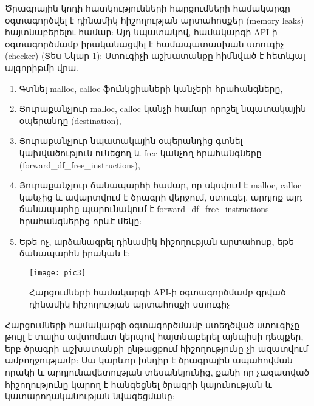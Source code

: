 Ծրագրային կոդի հատկությունների հարցումների համակարգը օգտագործվել է դինամիկ հիշողության
արտահոսքեր (memory leaks)\cite{MEMORYLEAK} հայտնաբերելու համար: Այդ նպատակով, համակարգի API-ի օգտագործմամբ
իրականացվել է համապատասխան ստուգիչ (checker) (Տես Նկար \ref{fig:figure3}): Ստուգիչի աշխատանքը հիմնված է հետևյալ ալգորիթմի վրա.
\begin{enumerate}
    \item Գտնել malloc, calloc ֆունկցիաների կանչերի հրահանգները,
    \item Յուրաքանչյուր malloc, calloc կանչի համար որոշել նպատակային օպերանդը (destination),
    \item Յուրաքանչյուր նպատակային օպերանդից գտնել կախվածություն ունեցող և free կանչող հրահանգները (forward\_df\_free\_instructions),
    \item Յուրաքանչյուր ճանապարհի համար, որ սկսվում է malloc, calloc կանչից և ավարտվում է ծրագրի վերջում, ստուգել,
    արդյոք այդ ճանապարհը պարունակում է forward\_df\_free\_instructions հրահանգներից որևէ մեկը:
    \item Եթե ոչ, արձանագրել դինամիկ հիշողության արտահոսք, եթե ճանապարհն իրական է:
\end{enumerate}

\begin{figure}[h]
    \centering
    \texttt{[image: pic3]}
    \caption{Հարցումների համակարգի API-ի օգտագործմամբ գրված դինամիկ հիշողության արտահոսքի ստուգիչ}
    \label{fig:figure3}
\end{figure}

Հարցումների համակարգի օգտագործմամբ ստեղծված ստուգիչը թույլ է տալիս ավտոմատ կերպով հայտնաբերել
այնպիսի դեպքեր, երբ ծրագրի աշխատանքի ընթացքում հիշողությունը չի ազատվում ամբողջությամբ: Սա կարևոր խնդիր է ծրագրային
ապահովման որակի և արդյունավետության տեսանկյունից, քանի որ չազատված հիշողությունը կարող է հանգեցնել ծրագրի
կայունության և կատարողականության նվազեցմանը:


